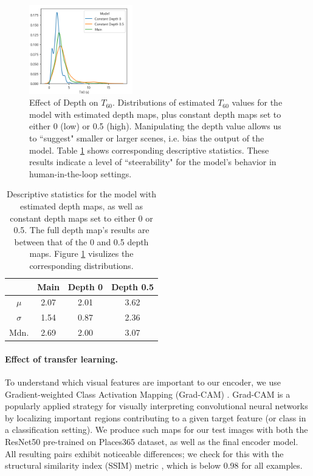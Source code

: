 \documentclass[10pt,twocolumn,letterpaper]{article}
\begin{document}
\begin{figure}
    \centering
    \includegraphics[width=0.4\textwidth]{t60_kde.png}
    \caption{Effect of Depth on ${T_{60}}$. Distributions of estimated ${T_{60}}$ values for the model with estimated depth maps, plus constant depth maps set to either 0 (low) or 0.5 (high). Manipulating the depth value allows us to ``suggest" smaller or larger scenes, i.e. bias the output of the model. Table \ref{tab:t60_distributions} shows corresponding descriptive statistics. These results indicate a level of ``steerability" for the model's behavior in human-in-the-loop settings.}
    \label{fig:t60_distributions}
\end{figure}

\begin{table}
    \small
    \centering
    \begin{tabular}{cccc}
        & Main & Depth 0 & Depth 0.5\\
        \hline
        $\mu$ & 2.07 & 2.01 & 3.62\\
        $\sigma$ & 1.54 & 0.87 & 2.36\\
        Mdn. & 2.69 & 2.00 & 3.07\\
    \end{tabular}
    \caption{Descriptive statistics for the model with estimated depth maps, as well as constant depth maps set to either 0 or 0.5. The full depth map's results are between that of the 0 and 0.5 depth maps. Figure \ref{fig:t60_distributions} visulizes the corresponding distributions.}
    \label{tab:t60_distributions}
\end{table}

\paragraph{Effect of transfer learning.}
To understand which visual features are important to our encoder, we use Gradient-weighted Class Activation Mapping (Grad-CAM) \cite{selvaraju2017grad}. Grad-CAM is a popularly applied strategy for visually interpreting convolutional neural networks by localizing important regions contributing to a given target feature (or class in a classification setting). We produce such maps for our test images with both the ResNet50 pre-trained on Places365 dataset, as well as the final encoder model. All resulting pairs exhibit noticeable differences; we check for this with the structural similarity index (SSIM) metric \cite{wang2004image}, which is below 0.98 for all examples.
\end{document}
